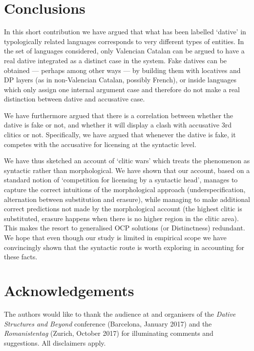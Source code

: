 \documentclass[output=paper,modfonts,nonflat,newtxmath,colorlinks,citecolor=brown]{langsci/langscibook}
\begin{document}
\section{Conclusions} %
\label{sec:cabre:4}

In this short contribution we have argued that what has been labelled ‘dative’ in typologically related languages corresponds to very different types of entities. In the set of languages considered, only Valencian Catalan can be argued to have a real dative integrated as a distinct case in the system. Fake datives can be obtained — perhaps among other ways — by building them with locatives and DP layers (as in non-Valencian Catalan, possibly French), or inside languages which only assign one internal argument case and therefore do not make a real distinction between dative and accusative case.

We have furthermore argued that there is a correlation between whether the dative is fake or not, and whether it will display a clash with accusative 3rd clitics or not. Specifically, we have argued that whenever the dative is fake, it competes with the accusative for licensing at the syntactic level.

We have thus sketched an account of ‘clitic wars’ which treats the phenomenon as syntactic rather than morphological. We have shown that our account, based on a standard notion of ‘competition for licensing by a syntactic head’, manages to capture the correct intuitions of the morphological approach (underspecification, alternation between substitution and erasure), while managing to make additional correct predictions not made by the morphological account (the highest clitic is substituted, erasure happens when there is no higher region in the clitic area). This makes the resort to generalised OCP solutions (or  Distinctness) redundant. We hope that even though our study is limited in empirical scope we have convincingly shown that the syntactic route is worth exploring in accounting for these facts.

\section*{Acknowledgements}
The authors would like to thank the audience at and organisers of the \textit{Dative Structures and Beyond} conference (Barcelona, January 2017) and the \textit{Romanistentag} (Zurich, October 2017) for illuminating comments and suggestions. All disclaimers apply.

\sloppy
\printbibliography[heading=subbibliography,notkeyword=this]
\end{document}
